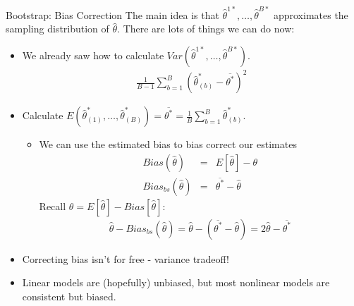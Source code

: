 \documentclass[aspectratio=169]{beamer}
\begin{document}
\begin{frame}{Bootstrap: Bias Correction}
\small
The main idea is that $\hat{\theta}^{1*},\ldots, \hat{\theta}^{B*}$ approximates the \alert{sampling distribution} of $\hat{\theta}$. There are lots of things we can do now:
\begin{itemize}
\item We already saw how to calculate $Var(\hat{\theta}^{1*},\ldots, \hat{\theta}^{B*})$.
\begin{eqnarray*}
\frac{1}{B-1} \sum_{b=1}^B (\hat{\theta}_{(b)}^* - \overline{\theta^{*}})^2
\end{eqnarray*}

\item Calculate $E(\hat{\theta}^{*}_{(1)},\ldots, \hat{\theta}^{*}_{(B)}) = \overline{\theta^{*}} = \frac{1}{B} \sum_{b=1}^B \hat{\theta}_{(b)}^*$.
\begin{itemize}
\item We can use the estimated bias to \alert{bias correct} our estimates
\begin{eqnarray*}
Bias(\hat{\theta}) &=&E[\hat{\theta}] - \theta \\
Bias_{bs}(\hat{\theta}) &=&\overline{\theta^{*}} -\hat{\theta}
\end{eqnarray*}
Recall $\theta = E[\hat{\theta}] - Bias[\hat{\theta}]$:
\begin{eqnarray*}
\hat{\theta}- Bias_{bs}(\hat{\theta}) = \hat{\theta}-(\overline{\theta^{*}}-\hat{\theta}) = 2 \hat{\theta} - \overline{\theta^{*}}
\end{eqnarray*}
\end{itemize}
\item Correcting bias isn't for free - variance tradeoff!
\item Linear models are (hopefully) unbiased, but most nonlinear models are \alert{consistent but biased}.
\end{itemize}

\end{frame}
\end{document}
